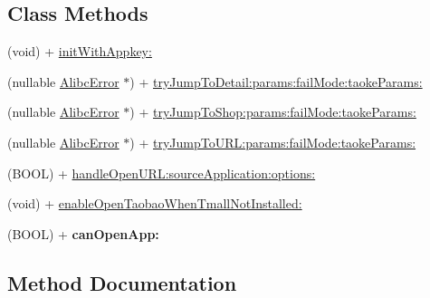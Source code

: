 \subsection*{Class Methods}
\begin{DoxyCompactItemize}
\item 
(void) + \mbox{\hyperlink{interface_alibc_link_partner_bridge_a33c867af01896bb4959da52209f4a563}{init\+With\+Appkey\+:}}
\item 
(nullable \mbox{\hyperlink{interface_alibc_error}{Alibc\+Error}} $\ast$) + \mbox{\hyperlink{interface_alibc_link_partner_bridge_a8a444eb3726a932f151d5a92f1069282}{try\+Jump\+To\+Detail\+:params\+:fail\+Mode\+:taoke\+Params\+:}}
\item 
(nullable \mbox{\hyperlink{interface_alibc_error}{Alibc\+Error}} $\ast$) + \mbox{\hyperlink{interface_alibc_link_partner_bridge_a21a7ef691411f27063c2c4934643f8d4}{try\+Jump\+To\+Shop\+:params\+:fail\+Mode\+:taoke\+Params\+:}}
\item 
(nullable \mbox{\hyperlink{interface_alibc_error}{Alibc\+Error}} $\ast$) + \mbox{\hyperlink{interface_alibc_link_partner_bridge_ab2013729987062e63d3e060ecafff15c}{try\+Jump\+To\+U\+R\+L\+:params\+:fail\+Mode\+:taoke\+Params\+:}}
\item 
(B\+O\+OL) + \mbox{\hyperlink{interface_alibc_link_partner_bridge_a92b3bf312238470882be6333e2c86668}{handle\+Open\+U\+R\+L\+:source\+Application\+:options\+:}}
\item 
(void) + \mbox{\hyperlink{interface_alibc_link_partner_bridge_aeb29a696d8b29065d216892f3ba1bab7}{enable\+Open\+Taobao\+When\+Tmall\+Not\+Installed\+:}}
\item 
\mbox{\label{interface_alibc_link_partner_bridge_a2ccf97dea62fd0290c05edb9a6287124}} 
(B\+O\+OL) + {\bfseries can\+Open\+App\+:}
\end{DoxyCompactItemize}


\subsection{Method Documentation}
\mbox{\label{interface_alibc_link_partner_bridge_aeb29a696d8b29065d216892f3ba1bab7}} 
